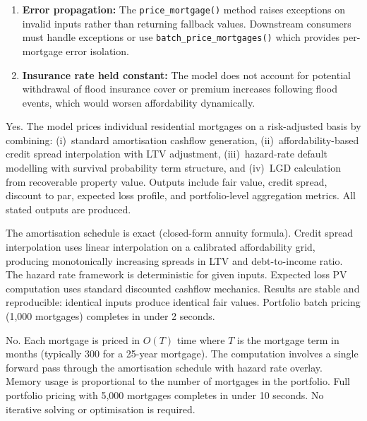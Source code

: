 \documentclass[11pt,a4paper]{article}
\begin{document}
\begin{enumerate}[nosep]
    \item \textbf{Error propagation:} The \texttt{price\_mortgage()} method raises
          exceptions on invalid inputs rather than returning fallback values.
          Downstream consumers must handle exceptions or use
          \texttt{batch\_price\_mortgages()} which provides per-mortgage error
          isolation.

    \item \textbf{Insurance rate held constant:} The model does not account for
          potential withdrawal of flood insurance cover or premium increases following
          flood events, which would worsen affordability dynamically.
\end{enumerate}

\mkmgovernance

Yes. The model prices individual residential mortgages on a risk-adjusted basis by combining: (i)~standard amortisation cashflow generation, (ii)~affordability-based credit spread interpolation with LTV adjustment, (iii)~hazard-rate default modelling with survival probability term structure, and (iv)~LGD calculation from recoverable property value. Outputs include fair value, credit spread, discount to par, expected loss profile, and portfolio-level aggregation metrics. All stated outputs are produced.

The amortisation schedule is exact (closed-form annuity formula). Credit spread interpolation uses linear interpolation on a calibrated affordability grid, producing monotonically increasing spreads in LTV and debt-to-income ratio. The hazard rate framework is deterministic for given inputs. Expected loss PV computation uses standard discounted cashflow mechanics. Results are stable and reproducible: identical inputs produce identical fair values. Portfolio batch pricing (1,000 mortgages) completes in under 2 seconds.

No. Each mortgage is priced in $O(T)$ time where $T$ is the mortgage term in months (typically 300 for a 25-year mortgage). The computation involves a single forward pass through the amortisation schedule with hazard rate overlay. Memory usage is proportional to the number of mortgages in the portfolio. Full portfolio pricing with 5,000 mortgages completes in under 10 seconds. No iterative solving or optimisation is required.
\end{document}
